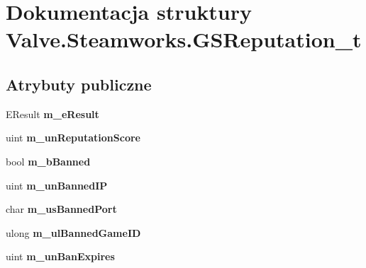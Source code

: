 \hypertarget{struct_valve_1_1_steamworks_1_1_g_s_reputation__t}{}\section{Dokumentacja struktury Valve.\+Steamworks.\+G\+S\+Reputation\+\_\+t}
\label{struct_valve_1_1_steamworks_1_1_g_s_reputation__t}
\subsection*{Atrybuty publiczne}
\begin{DoxyCompactItemize}
\item 
\mbox{\label{struct_valve_1_1_steamworks_1_1_g_s_reputation__t_a68b2e559af15ff659f73b34824b27dd3}} 
E\+Result {\bfseries m\+\_\+e\+Result}
\item 
\mbox{\label{struct_valve_1_1_steamworks_1_1_g_s_reputation__t_ae49ffb06046ce8ef960ede0dab6027ca}} 
uint {\bfseries m\+\_\+un\+Reputation\+Score}
\item 
\mbox{\label{struct_valve_1_1_steamworks_1_1_g_s_reputation__t_aa383e913b596b7853a8fe26ce8978fec}} 
bool {\bfseries m\+\_\+b\+Banned}
\item 
\mbox{\label{struct_valve_1_1_steamworks_1_1_g_s_reputation__t_af7a2ae5ac02bb2185d0d3779aee04909}} 
uint {\bfseries m\+\_\+un\+Banned\+IP}
\item 
\mbox{\label{struct_valve_1_1_steamworks_1_1_g_s_reputation__t_a967c2250072b8b87aa3cd9b705c5615b}} 
char {\bfseries m\+\_\+us\+Banned\+Port}
\item 
\mbox{\label{struct_valve_1_1_steamworks_1_1_g_s_reputation__t_abe94f6caf36fc9756ee247faad7f9b49}} 
ulong {\bfseries m\+\_\+ul\+Banned\+Game\+ID}
\item 
\mbox{\label{struct_valve_1_1_steamworks_1_1_g_s_reputation__t_a1b49ee0b9ab28e6da9d0b8dbecfa4a43}} 
uint {\bfseries m\+\_\+un\+Ban\+Expires}
\end{DoxyCompactItemize}


